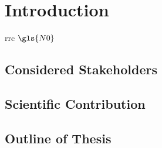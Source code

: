 \chapter{Introduction}\label{chap:introduction}

\cite*{TranGia2005}
\gls{rrc}
\(\gls{N0}\)

\section{Considered Stakeholders}
\section{Scientific Contribution}
\section{Outline of Thesis}